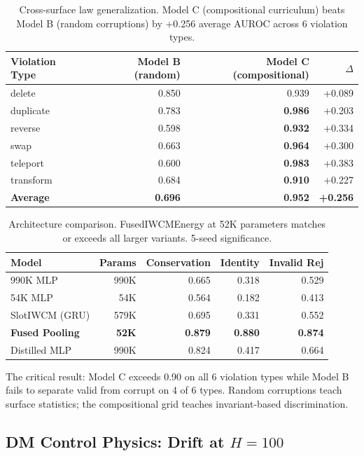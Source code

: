\documentclass[12pt]{article}
\begin{document}
\begin{table}[h]
\centering
\caption{Cross-surface law generalization. Model C (compositional curriculum) beats Model B (random corruptions) by +0.256 average AUROC across 6 violation types.}
\label{tab:cross_surface}
\begin{tabular}{@{}lrrr@{}}
\toprule
Violation Type & Model B (random) & Model C (compositional) & $\Delta$ \\
\midrule
delete & 0.850 & 0.939 & +0.089 \\
duplicate & 0.783 & \textbf{0.986} & +0.203 \\
reverse & 0.598 & \textbf{0.932} & +0.334 \\
swap & 0.663 & \textbf{0.964} & +0.300 \\
teleport & 0.600 & \textbf{0.983} & +0.383 \\
transform & 0.684 & \textbf{0.910} & +0.227 \\
\midrule
\textbf{Average} & \textbf{0.696} & \textbf{0.952} & \textbf{+0.256} \\
\bottomrule
\end{tabular}
\end{table}

\begin{table}[h]
\centering
\caption{Architecture comparison. FusedIWCMEnergy at 52K parameters matches or exceeds all larger variants. 5-seed significance.}
\label{tab:arch}
\begin{tabular}{@{}lrrrr@{}}
\toprule
Model & Params & Conservation & Identity & Invalid Rej \\
\midrule
990K MLP & 990K & 0.665 & 0.318 & 0.529 \\
54K MLP & 54K & 0.564 & 0.182 & 0.413 \\
SlotIWCM (GRU) & 579K & 0.695 & 0.331 & 0.552 \\
\textbf{Fused Pooling} & \textbf{52K} & \textbf{0.879} & \textbf{0.880} & \textbf{0.874} \\
Distilled MLP & 990K & 0.824 & 0.417 & 0.664 \\
\bottomrule
\end{tabular}
\end{table}

The critical result: Model C exceeds 0.90 on all 6 violation types while Model B fails to separate valid from corrupt on 4 of 6 types. Random corruptions teach surface statistics; the compositional grid teaches invariant-based discrimination.

\subsection{DM Control Physics: Drift at $H=100$}
\label{sec:exp_dm}
\end{document}
